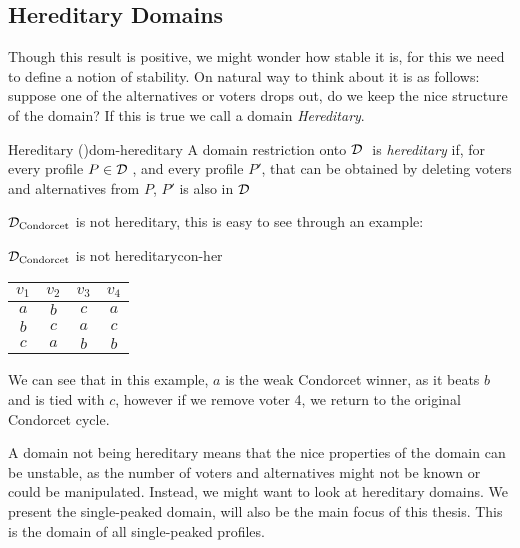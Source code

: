 \subsection{Hereditary Domains}

Though this result is positive, we might wonder how stable it is, for this we need to define a notion of stability. On natural way to think about it is as follows: suppose one of the alternatives or voters drops out, do we keep the nice structure of the domain? If this is true we call a domain \emph{Hereditary}.

\begin{definition}{Hereditary \textnormal{(\citet{elkindPreferenceRestrictionsComputational2022})}}{dom-hereditary}
	A domain restriction onto $\mathcal{D}_{\textnormal{ }}$ is \emph{hereditary} if, for every profile $P \in \mathcal{D}_{\textnormal{ }}$, and every profile $P'$, that can be obtained by deleting voters and alternatives from $P$, $P'$ is also in $\mathcal{D}_{\textnormal{ }}$
\end{definition}

$\mathcal{D}_{\textnormal{Condorcet}}$ is not hereditary, this is easy to see through an example:

\begin{example}{$\mathcal{D}_{\textnormal{Condorcet}}$ is not hereditary}{con-her}
	\begin{minipage}{0.25\linewidth}
		\begin{tabular}{cccc}
			\toprule
			$v_1$ & $v_2$ & $v_3$ & $v_4$ \\
			\midrule
			$a$   & $b$   & $c$   & $a$   \\
			$b$   & $c$   & $a$   & $c$   \\
			$c$   & $a$   & $b$   & $b$   \\
			\bottomrule
		\end{tabular}
	\end{minipage}
	\begin{minipage}[b]{0.70\linewidth}
		We can see that in this example, $a$ is the weak Condorcet winner, as it beats $b$ and is tied with $c$, however if we remove voter 4, we return to the original Condorcet cycle.
	\end{minipage}
\end{example}

A domain not being hereditary means that the nice properties of the domain can be unstable, as the number of voters and alternatives might not be known or could be manipulated. Instead, we might want to look at hereditary domains. We present the single-peaked domain, will also be the main focus of this thesis. This is the domain of all single-peaked profiles.


